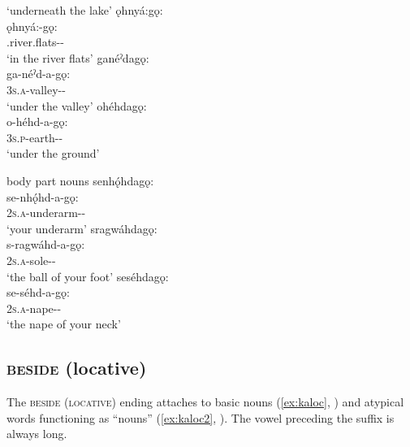 \glt `underneath the lake'
\ex ǫhnyá:gǫ:\\
\gll ǫhnyá:-gǫ:\\
 {\noprefix}.river.flats-{\joinerA}-\\
\glt `in the river flats'
\ex ganéˀdagǫ:\\
\gll ga-néˀd-a-gǫ:\\
 \textsc{3s.a}-valley-{\joinerA}-\\
\glt `under the valley'
\ex ohéhdagǫ:\\
\gll o-héhd-a-gǫ:\\
 \textsc{3s.p}-earth-{\joinerA}-\\
\glt `under the ground'
\z
\z

\ea\label{ex:gonex3} body part nouns
\ea senhǫ́hdagǫ:\\
\gll se-nhǫ́hd-a-gǫ:\\
 \textsc{2s.a}-underarm-{\joinerA}-\\
\glt `your underarm'
\ex sragwáhdagǫ:\\
\gll s-ragwáhd-a-gǫ:\\
 \textsc{2s.a}-sole-{\joinerA}-\\
\glt `the ball of your foot'
\ex seséhdagǫ:\\
\gll se-séhd-a-gǫ:\\
 \textsc{2s.a}-nape-{\joinerA}-\\
\glt `the nape of your neck'
\z
\z


\subsection{ \textsc{beside} (locative)} \label{[-:kˀah]}
The  \textsc{beside} (\textsc{locative}) ending attaches to basic nouns (\ref{ex:kaloc}, ) and atypical words functioning as “nouns” (\ref{ex:kaloc2}, ). The vowel preceding the suffix is always long.

